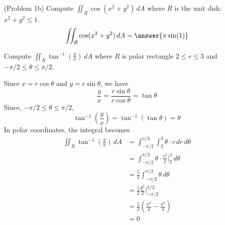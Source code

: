 \documentclass[handout]{ximera}
\begin{document}
\begin{problem}(Problem 1b)
Compute $\iint_R \cos(x^2 + y^2) \, dA$ where $R$ is the unit disk: $x^2 + y^2 \leq 1$.\\
\[
\iint_R \cos(x^2 + y^2) \, dA = \answer{\pi\sin(1)}
\]
\end{problem}




\begin{example}[Example 2]
Compute $\iint_R \tan^{-1}\left(\frac{y}{x}\right) \, dA$ where $R$ is polar rectangle $ 2 \leq r \leq 3$ and $-\pi/2 \leq \theta \leq \pi/2$.\\

\begin{image}
\end{image}

Since $x = r\cos \theta$ and $y = r\sin \theta$, we have
\[
\frac{y}{x} = \frac{r\sin \theta}{r\cos\theta} = \tan \theta
\]
Since, $-\pi/2 \leq \theta \leq \pi/2$,
\[
\tan^{-1} \left(\frac{y}{x}\right) = \tan^{-1} (\tan \theta) = \theta
\]
In polar coordinates, the integral becomes
\begin{align*}
\iint_R \tan^{-1}\left(\frac{y}{x}\right) \, dA & = \int_{-\pi/2}^{\pi/2} \int_2^3 \theta \cdot r \, dr \, d\theta\\
                                                & = \int_{-\pi/2}^{\pi/2}  \theta \cdot \frac{r^2}{2}\bigg|_2^3 \, d\theta\\
                                                & = \frac52 \int_{-\pi/2}^{\pi/2}  \theta \, d\theta\\
                                                &= \frac52 \frac{\theta^2}{2} \bigg|_{-\pi/2}^{\pi/2}\\
                                                &= \frac52 \left(\frac{\pi^2}{4} - \frac{\pi^2}{4}\right)\\
                                                &= 0
\end{align*}  

\end{example}
\end{document}
